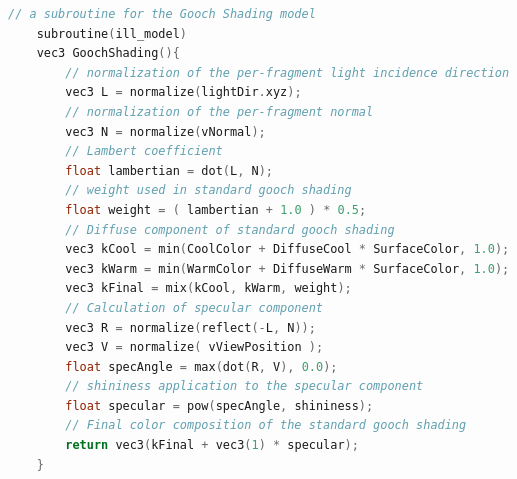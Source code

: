 \begin{lstlisting}[language=C++, caption=Standard Gooch shading subroutine implemented in fragment shader,label={code:gooch-standard}]
	// a subroutine for the Gooch Shading model
	subroutine(ill_model)
	vec3 GoochShading(){
		// normalization of the per-fragment light incidence direction
		vec3 L = normalize(lightDir.xyz);
		// normalization of the per-fragment normal
		vec3 N = normalize(vNormal);
		// Lambert coefficient
		float lambertian = dot(L, N);
		// weight used in standard gooch shading
		float weight = ( lambertian + 1.0 ) * 0.5;
		// Diffuse component of standard gooch shading
		vec3 kCool = min(CoolColor + DiffuseCool * SurfaceColor, 1.0);
		vec3 kWarm = min(WarmColor + DiffuseWarm * SurfaceColor, 1.0); 
		vec3 kFinal = mix(kCool, kWarm, weight);
		// Calculation of specular component
		vec3 R = normalize(reflect(-L, N));
		vec3 V = normalize( vViewPosition );
		float specAngle = max(dot(R, V), 0.0);
		// shininess application to the specular component
		float specular = pow(specAngle, shininess);
		// Final color composition of the standard gooch shading
		return vec3(kFinal + vec3(1) * specular);
	}
\end{lstlisting}

